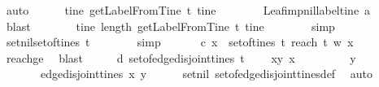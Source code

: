 \begin{isabellebody}
\ auto\isanewline
\ \ \ \isamarkupfalse%
\ {\isachardoublequoteopen}{\isasymforall}\ tine{\isachardot}\ getLabelFromTine\ t\ tine\ {\isacharequal}\ {\isacharbrackleft}{\isacharbrackright}{\isachardoublequoteclose}\isanewline
\ \ \ \ \isamarkupfalse%
\ Leaf{\isacharunderscore}imp{\isacharunderscore}nil{\isacharunderscore}label{\isacharunderscore}tine\ a\ \isamarkupfalse%
\ blast\ \isanewline
\ \ \isamarkupfalse%
\ \isamarkupfalse%
\ {\isachardoublequoteopen}{\isasymforall}\ tine{\isachardot}\ length\ {\isacharparenleft}getLabelFromTine\ t\ tine{\isacharparenright}\ {\isacharequal}\ {}{\isachardoublequoteclose}\isanewline
\ \ \ \ \isamarkupfalse%
\ simp\isanewline
\ \ \isamarkupfalse%
\ \isamarkupfalse%
\ set{\isacharunderscore}nil{\isacharcolon}{\isachardoublequoteopen}set{\isacharunderscore}of{\isacharunderscore}tines\ t\ {\isacharequal}\ {\isacharbraceleft}{\isacharbrackleft}{\isacharbrackright}{\isacharbraceright}{\isachardoublequoteclose}\isanewline
\ \ \ \ \isamarkupfalse%
\ simp\isanewline
\ \ \ \isamarkupfalse%
\ \isamarkupfalse%
\ c{\isacharcolon}{\isachardoublequoteopen}{\isasymexists}\ x\ {\isasymin}\ set{\isacharunderscore}of{\isacharunderscore}tines\ t{\isachardot}\ reach\ t\ w\ x\ {\isasymge}\ {}{\isachardoublequoteclose}\isanewline
\ \ \ \ \isamarkupfalse%
\ reachge{}\ \isamarkupfalse%
\ blast\isanewline
\ \ \isamarkupfalse%
\ \isamarkupfalse%
\ d{\isacharcolon}\ {\isachardoublequoteopen}set{\isacharunderscore}of{\isacharunderscore}edge{\isacharunderscore}disjoint{\isacharunderscore}tines\ t\ \ \isanewline
\ {\isacharequal}\ {\isacharbraceleft}{\isacharparenleft}x{\isacharcomma}y{\isacharparenright}{\isachardot}\ x\ {\isasymin}\ {\isacharbraceleft}{\isacharbrackleft}{\isacharbrackright}{\isacharbraceright}\isanewline
\ \ \ \ \ \ {\isasymand}\ y\ {\isasymin}\ {\isacharbraceleft}{\isacharbrackleft}{\isacharbrackright}{\isacharbraceright}\isanewline
\ \ \ \ \ \ {\isasymand}\ edge{\isacharunderscore}disjoint{\isacharunderscore}tines\ x\ y{\isacharbraceright}{\isachardoublequoteclose}\isanewline
\ \ \ \ \isamarkupfalse%
\ set{\isacharunderscore}nil\ set{\isacharunderscore}of{\isacharunderscore}edge{\isacharunderscore}disjoint{\isacharunderscore}tines{\isacharunderscore}def\ \isamarkupfalse%
\ auto\isanewline
\ \ \isamarkupfalse%

\end{isabellebody}

